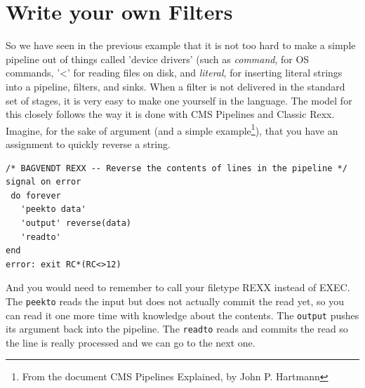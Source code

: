 \chapter{Write your own Filters}
So we have seen in the previous example that it is not too hard to
make a simple pipeline out of things called 'device drivers' (such as
\emph{command}, for OS commands, '<' for reading files on disk, and
\emph{literal}, for inserting literal strings into a pipeline,
filters, and sinks.
When a filter is not delivered in the standard set of stages, it is
very easy to make one yourself in the \nr{} language. The model for
this closely follows the way it is done with CMS Pipelines and Classic
Rexx.
Imagine, for the sake of argument (and a simple example\footnote{From
the document CMS Pipelines Explained, by John P. Hartmann}), that you have an
assignment to quickly reverse a string.
\begin{lstlisting}
/* BAGVENDT REXX -- Reverse the contents of lines in the pipeline */
signal on error
 do forever
   'peekto data'
   'output' reverse(data)
   'readto'
end
error: exit RC*(RC<>12)
\end{lstlisting}
And you would need to remember to call your filetype REXX instead of EXEC.  The \texttt{peekto} reads the input but does not actually commit the read yet, so you can read it one more time with knowledge about the contents. The \texttt{output} pushes its argument back into the pipeline. The \texttt{readto} reads and commits the read so the line is really processed and we can go to the next one.

